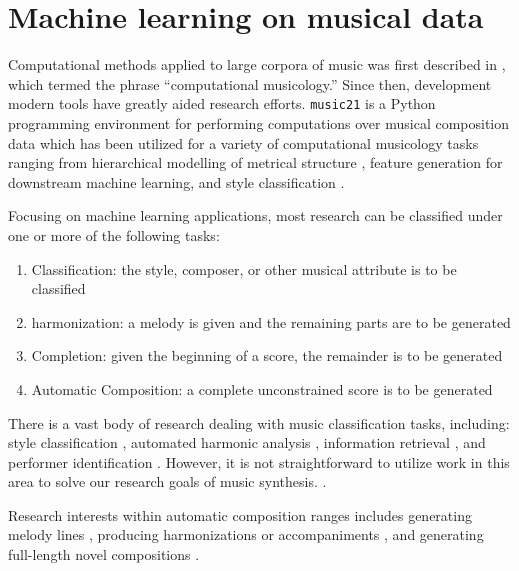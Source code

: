 \section{Machine learning on musical data}

Computational methods applied to large corpora of music was first described in
\citet{coutinho2005computational}, which termed the phrase ``computational
musicology.'' Since then, development modern tools have greatly aided research
efforts. \texttt{music21} \citep{Scott2015} is a Python programming environment
for performing computations over musical composition data which has been
utilized for a variety of computational musicology tasks ranging from
hierarchical modelling of metrical structure \citep{ariza2010modeling}, feature
generation for downstream machine learning\citep{Cuthbert2011}, and style
classification \citep{Herlands2014}.

Focusing on machine learning applications, most research can be
classified under one or more of the following tasks:
\begin{enumerate}
  \item Classification: the style, composer, or other musical attribute is to be classified
  \item harmonization: a melody is given and the remaining parts are to be generated
  \item Completion: given the beginning of a score, the remainder is to be generated
  \item Automatic Composition: a complete unconstrained score is to be generated
\end{enumerate}

There is a vast body of research dealing with music classification tasks,
including: style classification \citep{Herlands2014,dannenberg1997machine},
automated harmonic analysis \citep{ni2012end}, information retrieval
\citep{mandel2006support}, and performer identification
\citep{stamatatos2005automatic}. However, it is not straightforward to utilize
work in this area to solve our research goals of music synthesis.
.

Research interests within automatic composition ranges includes generating
melody lines
\citep{conklin1995multiple,todd1988sequential,todd1989connectionist}, producing
harmonizations or accompaniments
\citep{ebciouglu1988expert,hild1991harmonet,tsang1991harmonizing,ames1989markov,Allan2005,chuan2007hybrid},
and generating full-length novel compositions
\citep{elman1990finding,spangler1998bach,Eck2002,scirea2016metacompose}.

